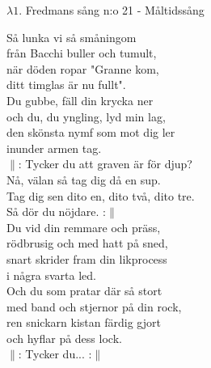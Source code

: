 \documentclass[a6paper,10pt]{article}
\begin{document}
\noindent
{}
\vspace{-5pt}
\begin{center}
\Large $\lambda1$. Fredmans sång n:o 21 - Måltidssång
\end{center}
\small Så lunka vi så småningom\\ 
från Bacchi buller och tumult,\\ 
när döden ropar "Granne kom,\\ 
ditt timglas är nu fullt". \\
Du gubbe, fäll din krycka ner\\ 
och du, du yngling, lyd min lag,\\ 
den skönsta nymf som mot dig ler\\ 
inunder armen tag.
\vspace{5pt}\\
$\|$: Tycker du att graven är för djup?\\ 
Nå, välan så tag dig då en sup.\\ 
Tag dig sen dito en, dito två, dito tre.\\ 
Så dör du nöjdare. :$\|$
\vspace{5pt}\\
Du vid din remmare och präss,\\
rödbrusig och med hatt på sned,\\ 
snart skrider fram din likprocess\\ 
i några svarta led.\\ 
Och du som pratar där så stort\\ 
med band och stjernor på din rock,\\ 
ren snickarn kistan färdig gjort\\ 
och hyflar på dess lock.
\vspace{5pt}\\
$\|$: Tycker du... :$\|$
\end{document}
